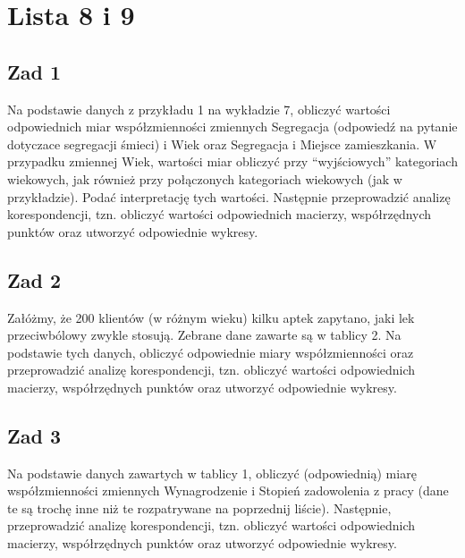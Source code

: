 \documentclass[12pt]{mwart}\usepackage[]{graphicx}\usepackage[]{color}
\begin{document}
\section*{Lista 8 i 9}
\subsection*{Zad 1}
Na podstawie danych z przykładu 1 na wykładzie 7, obliczyć wartości odpowiednich
miar współzmienności zmiennych Segregacja (odpowiedź na pytanie dotyczace segregacji śmieci) i Wiek oraz Segregacja i Miejsce zamieszkania. W przypadku zmiennej
Wiek, wartości miar obliczyć przy “wyjściowych” kategoriach wiekowych, jak również przy połączonych kategoriach wiekowych (jak w przykładzie). Podać interpretację tych wartości. Następnie przeprowadzić analizę korespondencji, tzn. obliczyć wartości odpowiednich macierzy, współrzędnych punktów oraz utworzyć odpowiednie wykresy.

\subsection*{Zad 2}
Załóżmy, że 200 klientów (w różnym wieku) kilku aptek zapytano, jaki lek przeciwbólowy zwykle stosują. Zebrane dane zawarte są w tablicy 2. Na podstawie tych danych, obliczyć odpowiednie miary współzmienności oraz przeprowadzić analizę korespondencji, tzn. obliczyć wartości odpowiednich macierzy, współrzędnych punktów
oraz utworzyć odpowiednie wykresy.

\subsection*{Zad 3}
Na podstawie danych zawartych w tablicy 1, obliczyć (odpowiednią) miarę współzmienności zmiennych Wynagrodzenie i Stopień zadowolenia z pracy (dane te są trochę inne niż te rozpatrywane na poprzednij liście). Następnie, przeprowadzić analizę korespondencji, tzn. obliczyć wartości odpowiednich macierzy, współrzędnych punktów oraz utworzyć odpowiednie wykresy.
\end{document}
